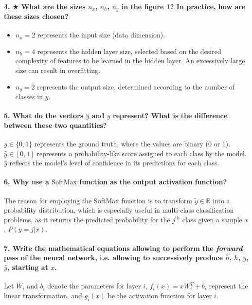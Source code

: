 \paragraph{4. $\bigstar$ What are the sizes $n_x$, $n_h$, $n_y$ in the figure 1? In practice, how are these sizes chosen?}
\begin{itemize}
    \item $n_x = 2$ represents the input size (data dimension).
    \item $n_h = 4$ represents the hidden layer size, selected based on the desired complexity of features to be learned in the hidden layer. An excessively large size can result in overfitting.
    \item $n_y = 2$ represents the output size, determined according to the number of classes in $y$.
\end{itemize}

\paragraph{5. What do the vectors $\hat{y}$ and $y$ represent? What is the difference between these two quantities?}
$y \in \{0,1\}$ represents the ground truth, where the values are binary (0 or 1).
$\hat{y} \in [0,1]$ represents a probability-like score assigned to each class by the model. $\hat{y}$ reflects the model's level of confidence in its predictions for each class.

\paragraph{6. Why use a $\text{SoftMax}$ function as the output activation function?}
The reason for employing the SoftMax function is to transform $\tilde{y} \in \mathbb{R}$ into a probability distribution, which is especially useful in multi-class classification problems, as it returns the predicted probability for the $j^\mathrm{th}$ class given a sample $x$, $ P(y=j | x) $. 

\paragraph{7. Write the mathematical equations allowing to perform the \textit{forward} pass of the neural network, i.e. allowing to successively produce $\hat{h}$, $ h $, $ \tilde{y} $, $ \hat{y} $, starting at $x$.}
Let $W_i$ and $b_i$ denote the parameters for layer $i$, $f_i(x) = x W_i ^T + b_i$ represent the linear transformation, and $g_i(x)$ be the activation function for layer $i$.

